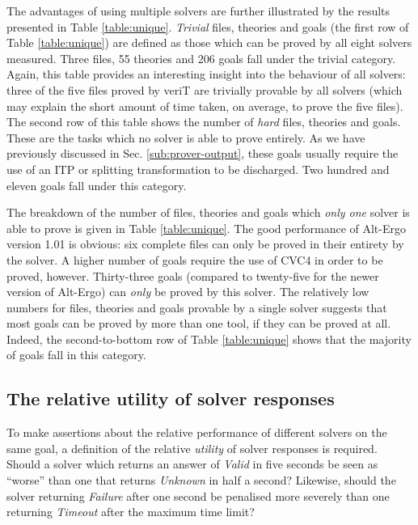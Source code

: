 The advantages of using multiple solvers are further illustrated by the results presented in Table \ref{table:unique}. \textit{Trivial} files, theories and goals (the first row of Table \ref{table:unique}) are defined as those which can be proved by all eight solvers measured. 
Three files, 55 theories and 206 goals fall under the trivial category.
Again, this table provides an interesting insight into the behaviour of all solvers: three of the five files proved by veriT are trivially provable by all solvers (which may explain the short amount of time taken, on average, to prove the five files). 
The second row of this table shows the number of \textit{hard} files, theories and goals. 
These are the tasks which no solver is able to prove entirely.
As we have previously discussed in Sec. \ref{sub:prover-output}, these goals usually require the use of an ITP or splitting transformation to be discharged.
Two hundred and eleven goals fall under this category.

The breakdown of the number of files, theories and goals which \textit{only one} solver is able to prove is given in Table \ref{table:unique}.
The good performance of Alt-Ergo version 1.01 is obvious: six complete files can only be proved in their entirety by the solver. 
A higher number of goals require the use of CVC4 in order to be proved, however.
Thirty-three goals (compared to twenty-five for the newer version of Alt-Ergo) can \textit{only} be proved by this solver.
The relatively low numbers for files, theories and goals provable by a single solver suggests that most goals can be proved by more than one tool, if they can be proved at all.
Indeed, the second-to-bottom row of Table \ref{table:unique} shows that the majority of goals fall in this category. 

\subsection{The relative utility of solver responses}
\label{sub:rel-util}

To make assertions about the relative performance of different solvers on the same goal, a definition of the relative \textit{utility} of solver responses is required.
Should a solver which returns an answer of \textit{Valid} in five seconds be seen as ``worse'' than one that returns \textit{Unknown} in half a second? 
Likewise, should the solver returning \textit{Failure} after one second be penalised more severely than one returning \textit{Timeout} after the maximum time limit?

